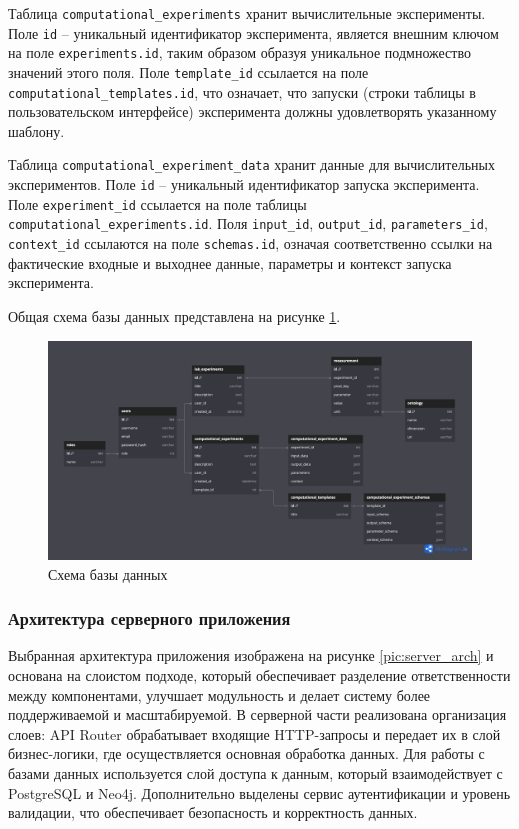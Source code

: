Таблица \texttt{computational\_experiments} хранит вычислительные эксперименты. Поле \texttt{id} -- уникальный идентификатор эксперимента, является внешним ключом на поле \texttt{experiments.id}, таким образом образуя уникальное подмножество значений этого поля. Поле \texttt{template\_id} ссылается на поле \texttt{computational\_templates.id}, что означает, что запуски (строки таблицы в пользовательском интерфейсе) эксперимента должны удовлетворять указанному шаблону.

Таблица \texttt{computational\_experiment\_data} хранит данные для вычислительных экспериментов. Поле \texttt{id} -- уникальный идентификатор запуска эксперимента. Поле \texttt{experiment\_id} ссылается на поле таблицы \texttt{computational\_experiments.id}. Поля \texttt{input\_id}, \texttt{output\_id}, \texttt{parameters\_id}, \texttt{context\_id} ссылаются на поле \texttt{schemas.id}, означая соответственно ссылки на фактические входные и выходнее данные, параметры и контекст запуска эксперимента.


Общая схема базы данных представлена на рисунке \ref{pic:db}.

\begin{figure}[H]
	\centering
	\includegraphics[width=\linewidth]{chapters/img/database_scheme.png}
	\caption{Схема базы данных}
	\label{pic:db}
\end{figure}


\subsubsection{Архитектура серверного приложения}

Выбранная архитектура приложения изображена на рисунке \ref{pic:server_arch} и основана на слоистом подходе, который обеспечивает разделение ответственности между компонентами, улучшает модульность и делает систему более поддерживаемой и масштабируемой. В серверной части реализована организация слоев: API Router обрабатывает входящие HTTP-запросы и передает их в слой бизнес-логики, где осуществляется основная обработка данных. Для работы с базами данных используется слой доступа к данным, который взаимодействует с PostgreSQL и Neo4j. Дополнительно выделены сервис аутентификации и уровень валидации, что обеспечивает безопасность и корректность данных.

